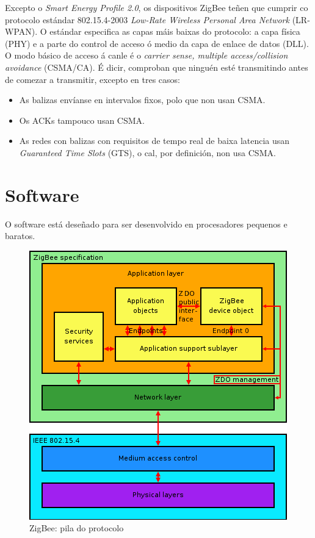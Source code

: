 Excepto o \textit{Smart Energy Profile 2.0}, os dispositivos ZigBee teñen que
cumprir co protocolo estándar 802.15.4-2003
\textit{Low-Rate Wireless Personal Area Network} (LR-WPAN). O estándar
especifica as capas máis baixas do protocolo: a capa física (PHY) e a parte do
control de acceso ó medio da capa de enlace de datos (DLL). O modo básico de
acceso á canle é o \textit{carrier sense, multiple access/collision avoidance}
(CSMA/CA). É dicir, comproban que ninguén esté transmitindo antes de comezar a
transmitir, excepto en tres casos:

\begin{itemize}
 \item As balizas envíanse en intervalos fixos, polo que non usan CSMA.
 \item Os ACKs tampouco usan CSMA.
 \item As redes con balizas con requisitos de tempo real de baixa latencia usan
       \textit{Guaranteed Time Slots} (GTS), o cal, por definición, non usa
       CSMA.
\end{itemize}

\section{Software}

O software está deseñado para ser desenvolvido en procesadores pequenos e
baratos.

\begin{figure}[htbp]
 \centering
 \includegraphics[scale=0.6,keepaspectratio=true]{./imagenes/zigbee-pila-protocolo.png}
 \caption[ZigBee: pila do protocolo]{ZigBee: pila do protocolo \cite{ZigBeeProtocolStack}}
 \label{figura:ZigBeePilaProtocolo}
\end{figure}

